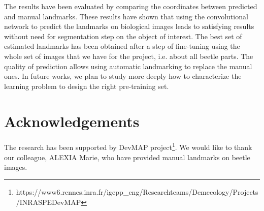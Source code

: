 \documentclass[10pt]{article}
\begin{document}
The results have been evaluated by comparing the coordinates between predicted and manual landmarks. These results have shown that using the convolutional network to predict the landmarks on biological images leads to satisfying results without need for segmentation step on the object of interest. The best set of estimated landmarks has been obtained after a step of fine-tuning using the whole set of images that we have for the project, i.e. about all beetle parts. The quality of prediction allows using automatic landmarking to replace the manual ones. In future works, we plan to study more deeply how to characterize the learning problem to design the right pre-training set.

\section*{Acknowledgements}
The research has been supported by DevMAP project\footnote{https://www6.rennes.inra.fr/igepp\_eng/Research\-teams/Demecology/Projects/INRA\-SPE\-DevMAP}. We would like to thank our colleague, ALEXIA Marie, who have provided manual landmarks on beetle images.


\end{document}
